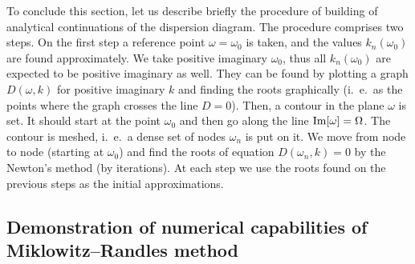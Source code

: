 \documentclass[12pt]{article}
\begin{document}
To conclude this section, let us describe briefly the procedure of building of analytical continuations of the dispersion diagram. The procedure comprises two steps.    
On the first step a reference point $\omega= \omega_0$ is taken, and the values
$k_n(\omega_0)$ are found approximately. We take positive imaginary $\omega_0$, thus
all $k_n(\omega_0)$ are expected to be positive imaginary as well. They can be found by plotting a graph $D (\omega , k)$ for positive imaginary $k$ and finding the roots graphically (i.~e.\ as the points where the graph crosses the line $D=0$). Then, a contour in the plane $\omega$ is set. It should 
start at the point $\omega_0$ and then go along the line ${\rm Im}[\omega] = \Omega$. 
The contour is meshed, i.~e.\ a dense set of nodes $\omega_n$ is put on it.   
We move from node to node (starting at $\omega_0$) and find the roots of equation $D(\omega_n, k) =0$ by the Newton's method (by iterations). At each step we use the roots found on the previous steps as the initial approximations.  


\subsection{Demonstration of numerical capabilities of Miklowitz--Randles method}
\label{sec_numerical}
\end{document}
